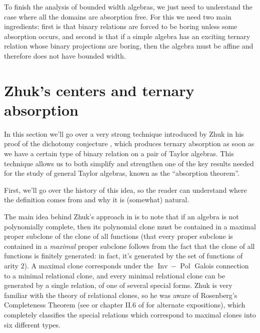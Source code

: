 \documentclass[letterpaper,11pt]{article}
\DeclareMathOperator{\Pol}{Pol}
\DeclareMathOperator{\Inv}{Inv}
\begin{document}

To finish the analysis of bounded width algebras, we just need to understand the case where all the domains are absorption free. For this we need two main ingredients: first is that binary relations are forced to be boring unless some absorption occurs, and second is that if a simple algebra has an exciting ternary relation whose binary projections are boring, then the algebra must be affine and therefore does not have bounded width.




\section{Zhuk's centers and ternary absorption}

In this section we'll go over a very strong technique introduced by Zhuk in his proof of the dichotomy conjecture \cite{zhuk-dichotomy}, which produces ternary absorption as soon as we have a certain type of binary relation on a pair of Taylor algebras. This technique allows us to both simplify and strengthen one of the key results needed for the study of general Taylor algebras, known as the ``absorption theorem''.

First, we'll go over the history of this idea, so the reader can understand where the definition comes from and why it is (somewhat) natural.

The main idea behind Zhuk's approach in \cite{zhuk-dichotomy} is to note that if an algebra is not polynomially complete, then its polynomial clone must be contained in a maximal proper subclone of the clone of all functions (that every proper subclone is contained in a \emph{maximal} proper subclone follows from the fact that the clone of all functions is finitely generated: in fact, it's generated by the set of functions of arity $2$). A maximal clone corresponds under the $\Inv-\Pol$ Galois connection to a minimal relational clone, and every minimal relational clone can be generated by a single relation, of one of several special forms. Zhuk is very familiar with the theory of relational clones, so he was aware of Rosenberg's Completeness Theorem \cite{rosenberg-completeness} (see \cite{pinsker-rosenberg} or chapter II.6 of \cite{lau-clone-theory} for alternate expositions), which completely classifies the special relations which correspond to maximal clones into six different types.
\end{document}
